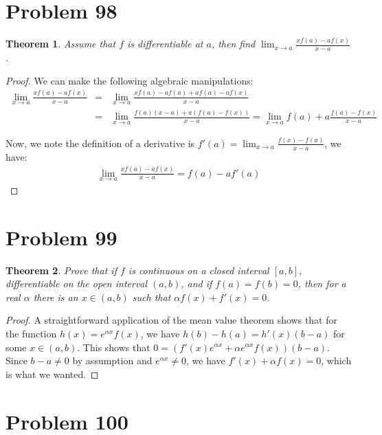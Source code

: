 \documentclass[psamsfonts]{amsart}
\newtheorem{thm}{Theorem}[section]
\theoremstyle{definition}
\theoremstyle{remark}
\numberwithin{equation}{section}
\begin{document}
\section{Problem 98}

\begin{thm}
Assume that $f$ is differentiable at $a$, then find $\lim_{x \to a} \frac{x f(a) - a f(x)}{x- a}$. 
\end{thm}

\begin{proof}
We can make the following algebraic manipulations:
\begin{eqnarray}
\lim_{x \to a} \frac{x f(a) - a f(x)}{x-a} &=& \lim_{x \to a} \frac{ x f(a) - a f(a) + a f(a) - a f(x)}{x-a} \\
&=& \lim_{x \to a} \frac{ f(a) (x-a) + a (f(a) - f(x))}{x-a} = \lim_{x \to a} f(a) + a \frac{f(a) - f(x)}{x-a}
\end{eqnarray}

Now, we note the definition of a derivative is $f'(a) = \lim_{x \to a} \frac{f(x) - f(a)}{x-a}$, we have:
\begin{eqnarray}
\lim_{x \to a} \frac{x f(a) - a f(x)}{x-a} = f(a) - a f'(a)
\end{eqnarray}
\end{proof}

\section{Problem 99}

\begin{thm}
Prove that if $f$ is continuous on a closed interval $[a,b]$, differentiable on the open interval $(a,b)$, and if $f(a) = f(b) = 0$, then for a real $\alpha$ there is an $x \in (a,b)$ such that $\alpha f(x) + f'(x) = 0$. 
\end{thm}

\begin{proof}
A straightforward application of the mean value theorem shows that for the function $h(x) = e^{\alpha x} f(x)$, we have $h(b) - h(a) = h'(x) (b-a)$ for some $x \in (a,b)$. This shows that $0 = ( f'(x) e^{\alpha x} + \alpha e^{\alpha x} f(x) ) (b-a)$. Since $b - a \neq 0$ by assumption and $e^{\alpha x} \neq 0$, we have $f'(x) + \alpha f(x) = 0$, which is what we wanted. 
\end{proof}

\section{Problem 100}
\end{document}
